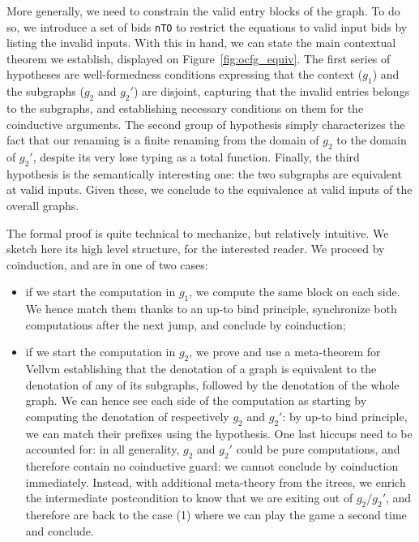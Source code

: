 \documentclass[11pt]{article}
\newcommand{\inlinecoq}[1]{\mbox{\lstinline[style=customcoq,columns=fixed,basewidth=.48em]{#1}}}
\newcommand{\ilc}[1]{\inlinecoq{#1}}
\begin{document}
More generally, we need to constrain the valid entry blocks of the graph. 
To do so, we introduce a set of bids \ilc{nTO} to restrict the equations to valid input bids by listing the invalid inputs.
With this in hand, we can state the main contextual theorem we establish, displayed on Figure~\ref{fig:ocfg_equiv}.
The first series of hypotheses are well-formedness conditions expressing that the context ($g_1$) and the subgraphs ($g_2$ and $g_2'$) are disjoint,
capturing that the invalid entries belongs to the subgraphs,
and establishing necessary conditions on them for the coinductive arguments.
The second group of hypothesis simply characterizes the fact that our renaming is a finite renaming from the domain of $g_2$ to the domain of $g_2'$, despite its very lose typing as a total function.
Finally, the third hypothesis is the semantically interesting one: the two subgraphs are equivalent at valid inputs.
Given these, we conclude to the equivalence at valid inputs of the overall graphs.

The formal proof is quite technical to mechanize, but relatively intuitive. We sketch here its high level structure, for the interested reader. We proceed by coinduction, and are in one of two cases:
\begin{itemize}
\item if we start the computation in $g_1$, we compute the same block on each side. We hence match them thanks to an up-to bind principle, synchronize both computations after the next jump, and conclude by coinduction;
\item if we start the computation in $g_2$, we prove and use a meta-theorem for Vellvm establishing that the denotation of a graph is equivalent to the denotation of any of its subgraphs, followed by the denotation of the whole graph. We can hence see each side of the computation as starting by computing the denotation of respectively $g_2$ and $g_2'$: by up-to bind principle, we can match their prefixes using the hypothesis. One last hiccups need to be accounted for: in all generality, $g_2$ and $g_2'$ could be pure computations, and therefore contain no coinductive guard: we cannot conclude by coinduction immediately.
Instead, with additional meta-theory from the itrees, we enrich the intermediate postcondition to know that we are exiting out of $g_2/g_2'$, and therefore are back to the case (1) where we can play the game a second time and conclude.
\end{itemize}

\end{document}
